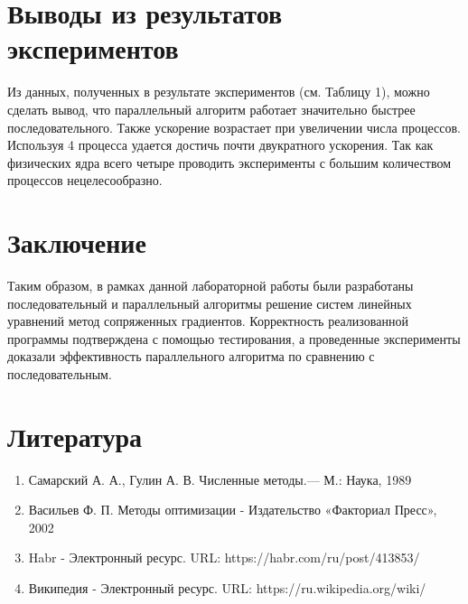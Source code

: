 \documentclass{report}
\begin{document}
\newpage

\section*{Выводы из результатов экспериментов}
Из данных, полученных в результате экспериментов (см. Таблицу 1), можно сделать вывод, что параллельный алгоритм работает значительно быстрее последовательного. Также ускорение возрастает при увеличении числа процессов. Используя 4 процесса удается достичь почти двукратного ускорения. Так как физических ядра всего четыре проводить эксперименты с большим количеством процессов нецелесообразно. 

\newpage

\section*{Заключение}
Таким образом, в рамках данной лабораторной работы были разработаны последовательный и параллельный алгоритмы решение систем линейных уравнений метод сопряженных градиентов. Корректность реализованной программы подтверждена с помощью тестирования, а проведенные эксперименты доказали эффективность параллельного алгоритма по сравнению с последовательным.
\newpage

\section*{Литература}
\begin{enumerate}
\item Самарский А. А., Гулин А. В. Численные методы.— М.: Наука, 1989
\item Васильев Ф. П.   Методы оптимизации - Издательство «Факториал Пресс», 2002
\item Habr - Электронный ресурс. URL: https://habr.com/ru/post/413853/
\item Википедия - Электронный ресурс. URL: https://ru.wikipedia.org/wiki/%
\end{enumerate} 
\newpage

\end{document}
